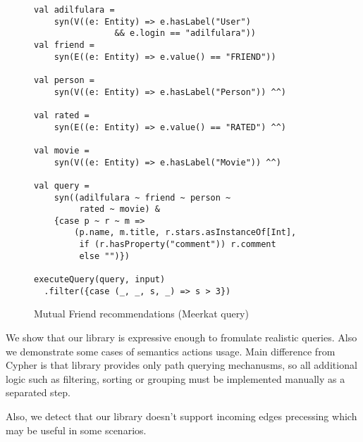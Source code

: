 \begin{figure}[h]
\begin{lstlisting}
val adilfulara =
    syn(V((e: Entity) => e.hasLabel("User")
                && e.login == "adilfulara"))
val friend =
    syn(E((e: Entity) => e.value() == "FRIEND"))

val person =
    syn(V((e: Entity) => e.hasLabel("Person")) ^^)

val rated =
    syn(E((e: Entity) => e.value() == "RATED") ^^)

val movie =
    syn(V((e: Entity) => e.hasLabel("Movie")) ^^)

val query =
    syn((adilfulara ~ friend ~ person ~
         rated ~ movie) &
    {case p ~ r ~ m =>
        (p.name, m.title, r.stars.asInstanceOf[Int],
         if (r.hasProperty("comment")) r.comment
         else "")})

executeQuery(query, input)
  .filter({case (_, _, s, _) => s > 3})
\end{lstlisting}
\caption{Mutual Friend recommendations (Meerkat query)}
\label{fig:meerkat_movie_query}
\end{figure}

We show that our library is expressive enough to fromulate realistic queries.
Also we demonstrate some cases of semantics actions usage.
Main difference from Cypher is that library provides only path querying mechanusms, so all additional logic such as
filtering, sorting or grouping must be implemented manually as a separated step.

Also, we detect that our library doesn't support incoming edges precessing which may be useful in some scenarios.